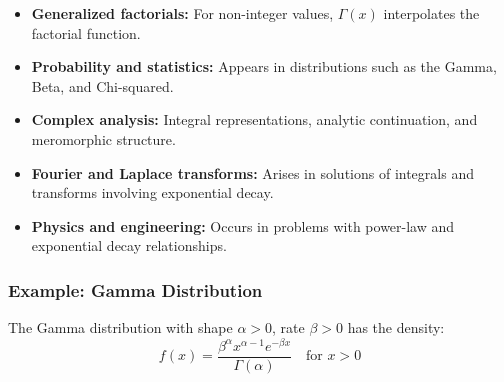 \begin{itemize}[label=\(-\)]
    \item \textbf{Generalized factorials:} For non-integer values, \( \Gamma(x) \) interpolates the factorial function.
    \item \textbf{Probability and statistics:} Appears in distributions such as the Gamma, Beta, and Chi-squared.
    \item \textbf{Complex analysis:} Integral representations, analytic continuation, and meromorphic structure.
    \item \textbf{Fourier and Laplace transforms:} Arises in solutions of integrals and transforms involving exponential decay.
    \item \textbf{Physics and engineering:} Occurs in problems with power-law and exponential decay relationships.
\end{itemize}

\subsubsection*{Example: Gamma Distribution}

The Gamma distribution with shape \( \alpha > 0 \), rate \( \beta > 0 \) has the density:
\[
f(x) = \frac{\beta^\alpha x^{\alpha - 1} e^{-\beta x}}{\Gamma(\alpha)} \quad \text{for } x > 0
\]

